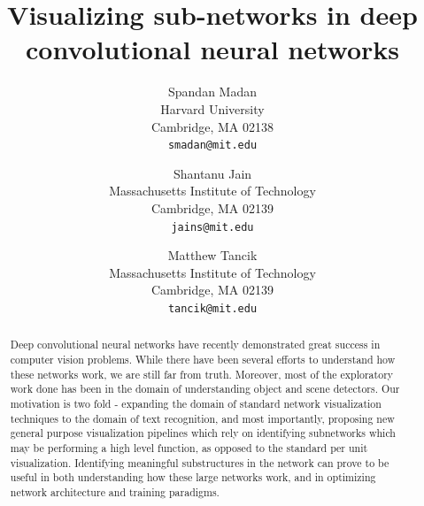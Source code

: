 \documentclass[10pt,twocolumn,letterpaper]{article}
\begin{document}
\title{Visualizing sub-networks in deep convolutional neural networks}


\author{Spandan Madan\\
Harvard University\\
Cambridge, MA 02138\\
{\tt\small smadan@mit.edu}
\and
Shantanu Jain\\
Massachusetts Institute of Technology\\
Cambridge, MA 02139\\
{\tt\small jains@mit.edu}
\and
Matthew Tancik\\
Massachusetts Institute of Technology\\
Cambridge, MA 02139\\
{\tt\small tancik@mit.edu}
}


\maketitle


\begin{abstract}
  Deep convolutional neural networks have recently demonstrated great success in computer vision problems. While there have been several efforts to understand how these networks work, we are still far from truth. Moreover, most of the exploratory work done has been in the domain of understanding object and scene detectors. Our motivation is two fold - expanding the domain of standard network visualization techniques to the domain of text recognition, and most importantly, proposing new general purpose visualization pipelines which rely on identifying subnetworks which may be performing a high level function, as opposed to the standard per unit visualization. Identifying meaningful substructures in the network can prove to be useful in both understanding how these large networks work, and in optimizing network architecture and training paradigms.
\end{abstract}


\end{document}
